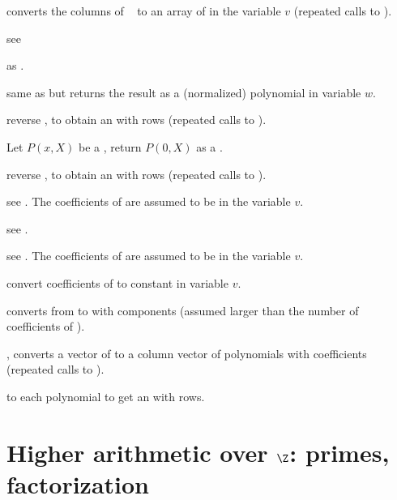  converts the columns of
~ to an array of  in the variable $v$
(repeated calls to ).

 see 

 as .

 same as
 but returns the result as a (normalized) polynomial
in variable $w$.

 reverse , to obtain
an  with  rows (repeated calls to ).

 Let $P(x,X)$ be a , return $P(0,X)$
as a .

 reverse , to obtain
an  with  rows (repeated calls to ).

 see .
The coefficients of  are assumed to be in the variable $v$.

 see .

 see .
The coefficients of  are assumed to be in the variable $v$.

 convert coefficients of  to
constant  in variable $v$.


 converts from  to 
with  components (assumed larger than the number of coefficients of
).

, converts a vector of  to a column
vector of polynomials with  coefficients (repeated calls to
).



  to each polynomial
to get an  with  rows.

\section{Higher arithmetic over $\Z$: primes, factorization}

